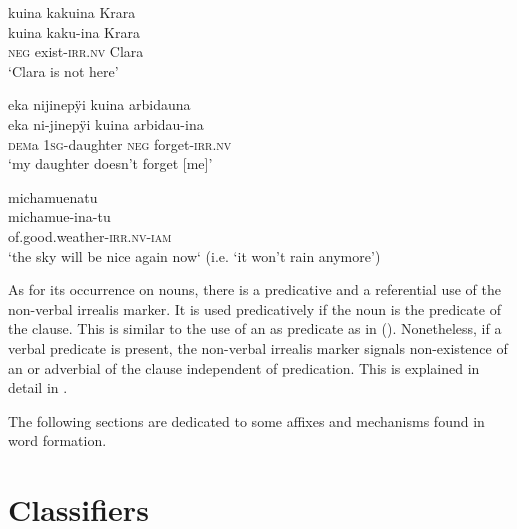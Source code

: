 \ea\label{ex:new23-kaku}
\begingl
\glpreamble kuina kakuina Krara\\
\gla kuina kaku-ina Krara\\
\glb \textsc{neg} exist-\textsc{irr.nv} Clara\\
\glft ‘Clara is not here’
\endgl
\trailingcitation{[cux-c120510l-1.199]}
\xe

\ea\label{ex:new23-forget}
\begingl
\glpreamble eka nijinepÿi kuina arbidauna\\
\gla eka ni-jinepÿi kuina arbidau-ina\\
\glb \textsc{dem}a 1\textsc{sg}-daughter \textsc{neg} forget-\textsc{irr.nv}\\
\glft ‘my daughter doesn’t forget [me]’
\endgl
\trailingcitation{[jxx-p110923l-1.215]}
\xe

\ea\label{ex:new23-weather}
\begingl
\glpreamble michamuenatu\\
\gla michamue-ina-tu\\
\glb of.good.weather-\textsc{irr.nv}-\textsc{iam}\\
\glft ‘the sky will be nice again now‘ (i.e. ‘it won’t rain anymore’)
\endgl
\trailingcitation{[jxx-p120515l-2.269]}
\xe

As for its occurrence on nouns, there is a predicative and a referential use of the non-verbal irrealis marker. It is used predicatively if the noun is the predicate of the clause. This is similar to the use of an  as predicate as in  (). Nonetheless, if a verbal predicate is present, the non-verbal irrealis marker signals non-existence of an  or adverbial of the clause independent of predication. This is explained in detail in .


The following sections are dedicated to some affixes and mechanisms found in word formation.


\section{Classifiers}\label{sec:Classifiers}

